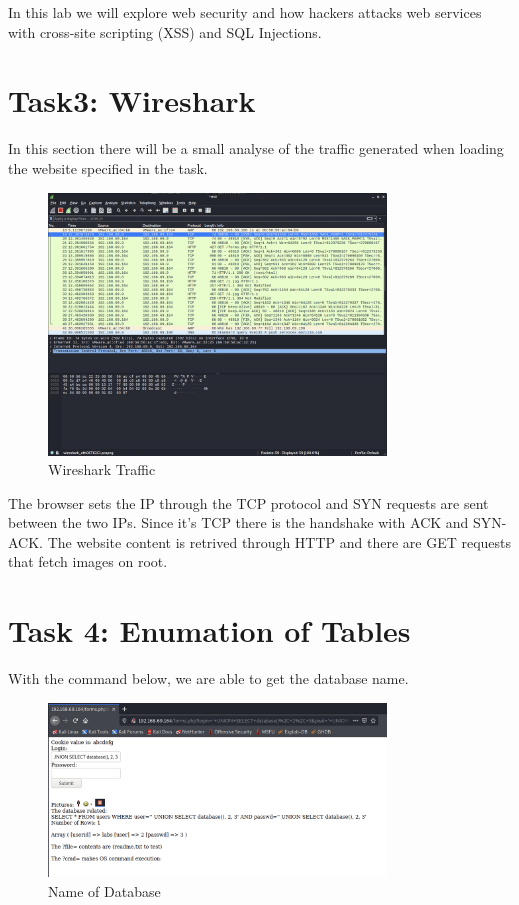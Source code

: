 In this lab we will explore web security and how hackers attacks web services
with cross-site scripting (XSS) and SQL Injections.

\section{Task3: Wireshark}
\label{task3-wireshark}
In this section there will be a small analyse of the traffic generated when
loading the website specified in the task.

\begin{figure}[H]
  \centering
  \includegraphics[width=0.8\textwidth]{figures/Wireshark Traffic}
  \caption{Wireshark Traffic}
  \label{f:Wireshark Traffic}
\end{figure}

The browser sets the IP through the TCP protocol and SYN requests are sent
between the two IPs. Since it's TCP there is the handshake with ACK and
SYN-ACK\@. The website content is retrived through HTTP and there are GET
requests that fetch images on root.

\section{Task 4: Enumation of Tables}
\label{task4-database}

With the command below, we are able to get the database name.
\begin{figure}[H]
  \centering
  \includegraphics[width=0.8\textwidth]{figures/database_name}
  \caption{Name of Database}
  \label{f:database-name}
\end{figure}

